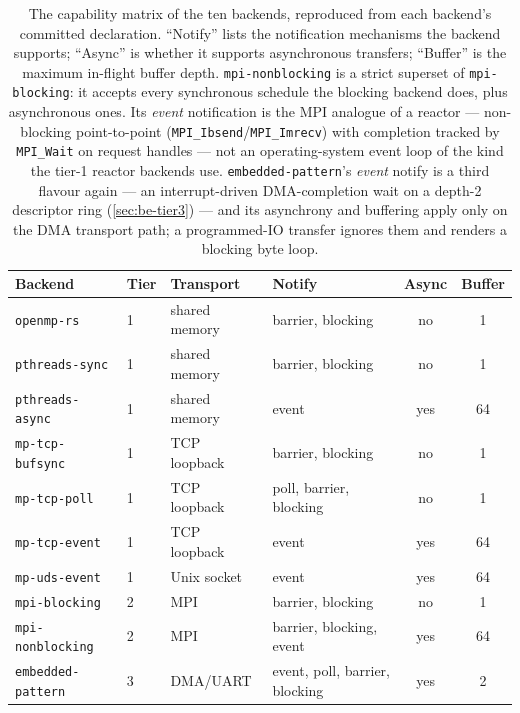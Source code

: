 \begin{table}[t]
  \centering
  \footnotesize
  \setlength{\tabcolsep}{4pt}
  \begin{tabular}{@{}llllcc@{}}
    \toprule
    Backend & Tier & Transport & Notify & Async & Buffer \\
    \midrule
    \texttt{openmp-rs}       & 1 & shared memory & barrier, blocking        & no  & 1 \\
    \texttt{pthreads-sync}   & 1 & shared memory & barrier, blocking        & no  & 1 \\
    \texttt{pthreads-async}  & 1 & shared memory & event                    & yes & 64 \\
    \texttt{mp-tcp-bufsync}  & 1 & TCP loopback  & barrier, blocking        & no  & 1 \\
    \texttt{mp-tcp-poll}     & 1 & TCP loopback  & poll, barrier, blocking  & no  & 1 \\
    \texttt{mp-tcp-event}    & 1 & TCP loopback  & event                    & yes & 64 \\
    \texttt{mp-uds-event}    & 1 & Unix socket   & event                    & yes & 64 \\
    \texttt{mpi-blocking}    & 2 & MPI           & barrier, blocking        & no  & 1 \\
    \texttt{mpi-nonblocking} & 2 & MPI           & barrier, blocking, event & yes & 64 \\
    \texttt{embedded-pattern}& 3 & DMA/UART      & event, poll, barrier, blocking & yes & 2 \\
    \bottomrule
  \end{tabular}
  \caption{The capability matrix of the ten backends, reproduced from each
  backend's committed declaration. ``Notify'' lists the notification mechanisms
  the backend supports; ``Async'' is whether it supports asynchronous transfers;
  ``Buffer'' is the maximum in-flight buffer depth. \texttt{mpi-nonblocking} is a
  strict superset of \texttt{mpi-blocking}: it accepts every synchronous schedule
  the blocking backend does, plus asynchronous ones. Its \emph{event} notification
  is the MPI analogue of a reactor --- non-blocking point-to-point
  (\texttt{MPI\_Ibsend}/\texttt{MPI\_Imrecv}) with completion tracked by
  \texttt{MPI\_Wait} on request handles --- not an operating-system event loop of the
  kind the tier-1 reactor backends use. \texttt{embedded-pattern}'s \emph{event}
  notify is a third flavour again --- an interrupt-driven DMA-completion wait on a
  depth-2 descriptor ring (\cref{sec:be-tier3}) --- and its asynchrony and buffering
  apply only on the DMA transport path; a programmed-IO transfer ignores them and
  renders a blocking byte loop.}
  \label{tab:capabilities}
\end{table}

